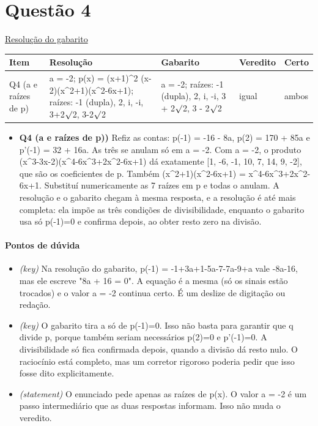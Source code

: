 \documentclass{article}%
\begin{document}
\section*{Questão 4}%
\href{https://poliedroresolve.sistemapoliedro.com.br/vestibulares/ita/2027/ita-2-fase-dia-1-20-10-2026-2-fase-dia-1/dissertativa-4-matematica-2-fase-dia-1-ita-2027}{Resolução do gabarito}\par\smallskip%
\begin{longtable}{@{}p{} p{} p{} p{} p{}@{}}\toprule Item & Resolução & Gabarito & Veredito & Certo \\ \midrule
Q4 (a e raízes de p) & a = -2; p(x) = (x+1)\^{}2 (x-2)(x\^{}2+1)(x\^{}2-6x+1); raízes: -1 (dupla), 2, i, -i, 3+2$\surd$2, 3-2$\surd$2 & a = -2; raízes: -1 (dupla), 2, i, -i, 3 + 2$\surd$2, 3 - 2$\surd$2 & igual & ambos \\
\bottomrule\end{longtable}%
\begin{itemize}%
\item%
\textbf{Q4 (a e raízes de p))} Refiz as contas: p(-1) = -16 - 8a, p(2) = 170 + 85a e p'(-1) = 32 + 16a. As três se anulam só em a = -2. Com a = -2, o produto (x\^{}3-3x-2)(x\^{}4-6x\^{}3+2x\^{}2-6x+1) dá exatamente {[}1, -6, -1, 10, 7, 14, 9, -2{]}, que são os coeficientes de p. Também (x\^{}2+1)(x\^{}2-6x+1) = x\^{}4-6x\^{}3+2x\^{}2-6x+1. Substituí numericamente as 7 raízes em p e todas o anulam. A resolução e o gabarito chegam à mesma resposta, e a resolução é até mais completa: ela impõe as três condições de divisibilidade, enquanto o gabarito usa só p(-1)=0 e confirma depois, ao obter resto zero na divisão.%
\end{itemize}%
\paragraph{Pontos de dúvida}%
\begin{itemize}%
\item%
\textit{(key)} Na resolução do gabarito, p(-1) = -1+3a+1-5a-7-7a-9+a vale -8a-16, mas ele escreve "8a + 16 = 0". A equação é a mesma (só os sinais estão trocados) e o valor a = -2 continua certo. É um deslize de digitação ou redação.%
\item%
\textit{(key)} O gabarito tira a só de p(-1)=0. Isso não basta para garantir que q divide p, porque também seriam necessários p(2)=0 e p'(-1)=0. A divisibilidade só fica confirmada depois, quando a divisão dá resto nulo. O raciocínio está completo, mas um corretor rigoroso poderia pedir que isso fosse dito explicitamente.%
\item%
\textit{(statement)} O enunciado pede apenas as raízes de p(x). O valor a = -2 é um passo intermediário que as duas respostas informam. Isso não muda o veredito.%
\end{itemize}%
\end{document}

